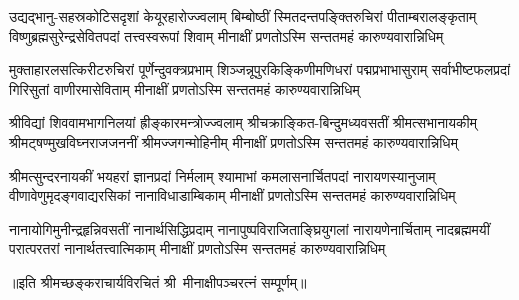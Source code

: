 

\fourlineindentedshloka
{उद्यद्भानु-सहस्रकोटिसदृशां केयूरहारोज्ज्वलाम्}
{बिम्बोष्ठीं स्मितदन्तपङ्क्तिरुचिरां पीताम्बरालङ्कृताम्‌}
{विष्णुब्रह्मसुरेन्द्रसेवितपदां तत्त्वस्वरूपां शिवाम्}
{मीनाक्षीं प्रणतोऽस्मि सन्ततमहं कारुण्यवारान्निधिम्‌}%

\fourlineindentedshloka
{मुक्ताहारलसत्किरीटरुचिरां पूर्णेन्दुवक्त्रप्रभाम्}
{शिञ्जन्नूपुरकिङ्किणीमणिधरां पद्मप्रभाभासुराम्‌}
{सर्वाभीष्टफलप्रदां गिरिसुतां वाणीरमासेविताम्}
{मीनाक्षीं प्रणतोऽस्मि सन्ततमहं कारुण्यवारान्निधिम्‌}%

\fourlineindentedshloka
{श्रीविद्यां शिववामभागनिलयां ह्रीङ्कारमन्त्रोज्ज्वलाम्}
{श्रीचक्राङ्कित-बिन्दुमध्यवसतीं श्रीमत्सभानायकीम्}
{श्रीमट्षण्मुखविघ्नराजजननीं श्रीमज्जगन्मोहिनीम्}
{मीनाक्षीं प्रणतोऽस्मि सन्ततमहं कारुण्यवारान्निधिम्}%

\fourlineindentedshloka
{श्रीमत्सुन्दरनायकीं भयहरां ज्ञानप्रदां निर्मलाम्‌}
{श्यामाभां कमलासनार्चितपदां नारायणस्यानुजाम्‌}
{वीणावेणुमृदङ्गवाद्यरसिकां नानाविधाडाम्बिकाम्}
{मीनाक्षीं प्रणतोऽस्मि सन्ततमहं कारुण्यवारान्निधिम्‌}%

\fourlineindentedshloka
{नानायोगिमुनीन्द्रहृन्निवसतीं नानार्थसिद्धिप्रदाम्‌}
{नानापुष्पविराजिताङ्घ्रियुगलां नारायणेनार्चिताम्‌}
{नादब्रह्ममयीं परात्परतरां नानार्थतत्त्वात्मिकाम्}
{मीनाक्षीं प्रणतोऽस्मि सन्ततमहं कारुण्यवारान्निधिम्‌}%

॥इति श्रीमच्छङ्कराचार्यविरचितं श्री~मीनाक्षीपञ्चरत्नं सम्पूर्णम्॥